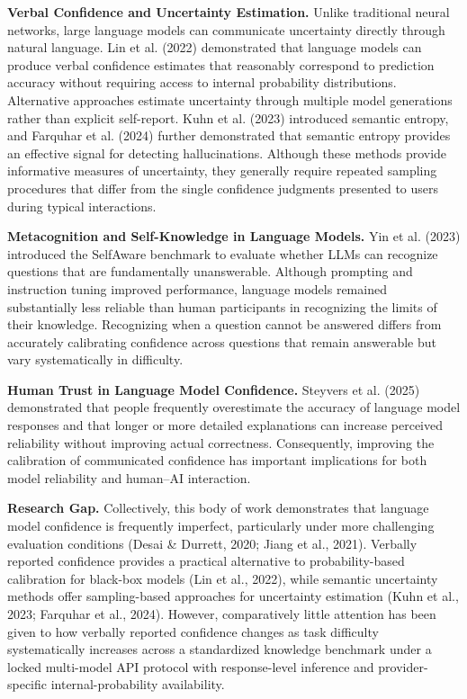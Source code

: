 \documentclass[twoside,twocolumn,10pt]{article}
\begin{document}
\textbf{Verbal Confidence and Uncertainty Estimation.}
Unlike traditional neural networks, large language models can communicate uncertainty directly through natural language. Lin et al. (2022) demonstrated that language models can produce verbal confidence estimates that reasonably correspond to prediction accuracy without requiring access to internal probability distributions. Alternative approaches estimate uncertainty through multiple model generations rather than explicit self-report. Kuhn et al. (2023) introduced semantic entropy, and Farquhar et al. (2024) further demonstrated that semantic entropy provides an effective signal for detecting hallucinations. Although these methods provide informative measures of uncertainty, they generally require repeated sampling procedures that differ from the single confidence judgments presented to users during typical interactions.

\textbf{Metacognition and Self-Knowledge in Language Models.}
Yin et al. (2023) introduced the SelfAware benchmark to evaluate whether LLMs can recognize questions that are fundamentally unanswerable. Although prompting and instruction tuning improved performance, language models remained substantially less reliable than human participants in recognizing the limits of their knowledge. Recognizing when a question cannot be answered differs from accurately calibrating confidence across questions that remain answerable but vary systematically in difficulty.

\textbf{Human Trust in Language Model Confidence.}
Steyvers et al. (2025) demonstrated that people frequently overestimate the accuracy of language model responses and that longer or more detailed explanations can increase perceived reliability without improving actual correctness. Consequently, improving the calibration of communicated confidence has important implications for both model reliability and human--AI interaction.

\textbf{Research Gap.}
Collectively, this body of work demonstrates that language model confidence is frequently imperfect, particularly under more challenging evaluation conditions (Desai \& Durrett, 2020; Jiang et al., 2021). Verbally reported confidence provides a practical alternative to probability-based calibration for black-box models (Lin et al., 2022), while semantic uncertainty methods offer sampling-based approaches for uncertainty estimation (Kuhn et al., 2023; Farquhar et al., 2024). However, comparatively little attention has been given to how verbally reported confidence changes as task difficulty systematically increases across a standardized knowledge benchmark under a locked multi-model API protocol with response-level inference and provider-specific internal-probability availability.
\end{document}
